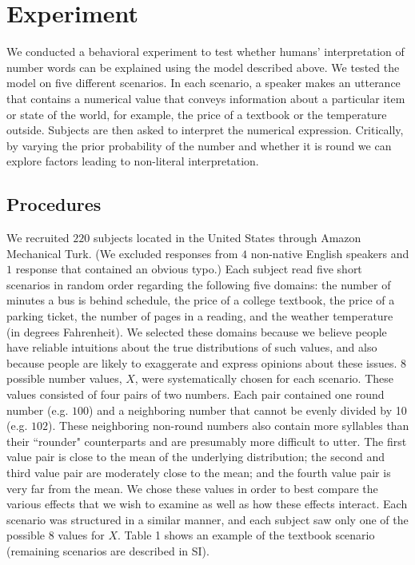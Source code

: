 \documentclass{article} %
\begin{document}
\section{Experiment}

We conducted a behavioral experiment to test whether humans' interpretation of number words can be explained using the model described above. We tested the model on five different scenarios. In each scenario, a speaker makes an utterance that contains a numerical value that conveys information about a particular item or state of the world, for example, the price of a textbook or the temperature outside. Subjects are then asked to interpret the numerical expression. Critically, by varying the prior probability of the number and whether it is round we can explore factors leading to non-literal interpretation.

\subsection{Procedures}

We recruited $220$ subjects located in the United States through Amazon Mechanical Turk. (We excluded responses from $4$ non-native English speakers and $1$ response that contained an obvious typo.) Each subject read five short scenarios in random order regarding the following five domains: the number of minutes a bus is behind schedule, the price of a college textbook, the price of a parking ticket, the number of pages in a reading, and the weather temperature (in degrees Fahrenheit). We selected these domains because we believe people have reliable intuitions about the true distributions of such values, and also because people are likely to exaggerate and express opinions about these issues. $8$ possible number values, $X$, were systematically chosen for each scenario. These values consisted of four pairs of two numbers. Each pair contained one round number (e.g. $100$) and a neighboring number that cannot be evenly divided by 10 (e.g. $102$). These neighboring non-round numbers also contain more syllables than their ``rounder" counterparts and are presumably more difficult to utter. The first value pair is close to the mean of the underlying distribution; the second and third value pair are moderately close to the mean; and the fourth value pair is very far from the mean. We chose these values in order to best compare the various effects that we wish to examine as well as how these effects interact. Each scenario was structured in a similar manner, and each subject saw only one of the possible $8$ values for $X$. Table 1 shows an example of the textbook scenario (remaining  scenarios are described in SI).
\end{document}
